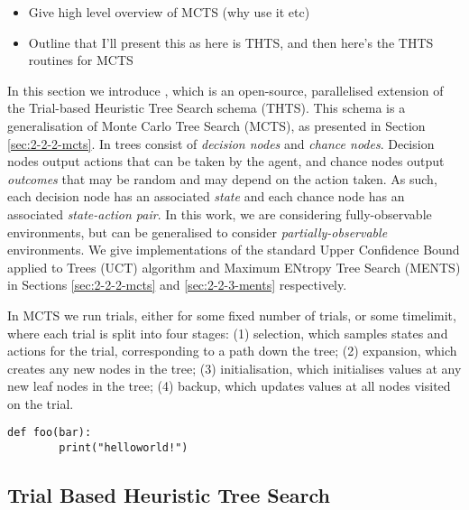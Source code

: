     \begin{itemize}
        \item Give high level overview of MCTS (why use it etc)
        \item Outline that I'll present this as here is THTS, and then here's the THTS routines for MCTS
    \end{itemize}

    In this section we introduce \thtspp\ewe \cite{thtspp}, which is an open-source, parallelised extension of the  Trial-based Heuristic Tree Search schema \cite{thts} (THTS). This schema is a generalisation of Monte Carlo Tree Search (MCTS), as presented in Section \ref{sec:2-2-2-mcts}. In \thtspp\ewe trees consist of \textit{decision nodes} and \textit{chance nodes}. Decision nodes output actions that can be taken by the agent, and chance nodes output \textit{outcomes} that may be random and may depend on the action taken. As such, each decision node has an associated \textit{state} and each chance node has an associated \textit{state-action pair}. In this work, we are considering fully-observable environments, but \thtspp\ewe can be generalised to consider \textit{partially-observable} environments. We give \thtspp\ewe implementations of the standard Upper Confidence Bound applied to Trees (UCT) algorithm and Maximum ENtropy Tree Search (MENTS) in Sections \ref{sec:2-2-2-mcts} and \ref{sec:2-2-3-ments} respectively.

    In MCTS we run trials, either for some fixed number of trials, or some timelimit, where each trial is split into four stages: 
        (1) selection, which samples states and actions for the trial, corresponding to a path down the tree;
        (2) expansion, which creates any new nodes in the tree; 
        (3) initialisation, which initialises values at any new leaf nodes in the tree;
        (4) backup, which updates values at all nodes visited on the trial.


    \begin{lstlisting}
def foo(bar):
        print("helloworld!")
    \end{lstlisting}

    \subsection{Trial Based Heuristic Tree Search}
    \label{sec:2-2-1-thts}
    
